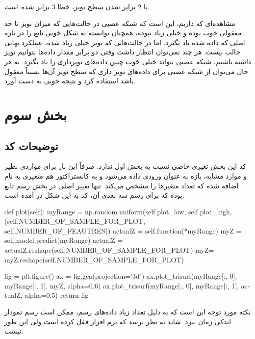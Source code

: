 \documentclass[12pt,titlepage,a4page , tikz , multi,table , svgnames,xcdraw]{article}
\begin{document}
با $2$ برابر شدن سطح نویز، خطا $3$ برابر شده است.

\hrulefill


مشاهده‌ای که داریم، این است که شبکه عصبی در حالت‌هایی که میزان نویز تا حد معقولی خوب بوده و خیلی زیاد نبوده، همچنان توانسته به شکل خوبی تابع را در بازه اصلی که داده شده یاد بگیرد. اما در حالت‌هایی که نویز خیلی زیاد شده، عملکرد نهایی جالب نیست. هر چند نمی‌توان انتظار داشت وقتی دو برابر مقدار داده‌ها بتوانیم نویز داشته باشیم، شبکه عصبی بتواند خیلی خوب چنین داده‌های نویزداری را یاد بگیرد. به هر حال می‌توان از شبکه عصبی برای داده‌های نویز داری که سطح نویز آن‌ها نسبتاً معقول باشد استفاده کرد و نتیجه خوبی به دست آورد.

\section{بخش سوم}
\subsection{توضیحات کد}

کد این بخش تغیری خاصی نسبت به بخش اول ندارد. صرفاً این بار برای مواردی نظیر  و موارد مشابه، بازه به عنوان ورودی داده می‌شود و به کانستراکتور هم متغیری به نام  اضافه شده که تعداد متغیرها را مشخص می‌کند. تنها تغییر اصلی در بخش رسم تابع بوده که برای رسم سه بعدی آن، کد به این شکل در آمده است.


\begin{latin}
\begin{python}[language=Python]

    def plot(self):
        myRange = np.random.uniform(self.plot_low, self.plot_high,
                                    (self.NUMBER_OF_SAMPLE_FOR_PLOT,
                                     self.NUMBER_OF_FEAUTRES))
        actualZ = self.function(*myRange)
        myZ = self.model.predict(myRange)
        actualZ = actualZ.reshape(self.NUMBER_OF_SAMPLE_FOR_PLOT)
        myZ= myZ.reshape(self.NUMBER_OF_SAMPLE_FOR_PLOT)

        fig = plt.figure()
        ax = fig.gca(projection='3d')
        ax.plot_trisurf(myRange[:, 0], myRange[:, 1], myZ, alpha=0.6)
        ax.plot_trisurf(myRange[:, 0], myRange[:, 1],
         actualZ, alpha=0.5)
        return fig
\end{python}

\end{latin}

نکته مورد توجه این است که به دلیل تعداد زیاد داده‌های رسم، ممکن است رسم نمودار اندکی زمان ببرد. شاید به نظر برسد که نرم افزار قفل کرده است ولی این طور نیست.
\end{document}
